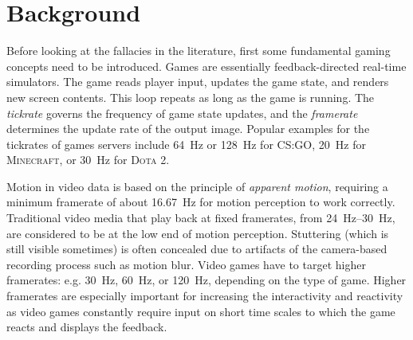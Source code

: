 \section{Background}
\label{sec:background}

Before looking at the fallacies in the literature, first some fundamental gaming concepts need to be introduced. Games are essentially feedback-directed real-time simulators. The game reads player input, updates the game state, and renders new screen contents. This loop repeats as long as the game is running. The \textit{tickrate} governs the frequency of game state updates, and the \textit{framerate} determines the update rate of the output image. Popular examples for the tickrates of games servers include \SI{64}{\hertz} or \SI{128}{\hertz} for \textsc{CS:GO}, \SI{20}{\hertz} for \textsc{Minecraft}, or \SI{30}{\hertz} for \textsc{Dota 2}.

Motion in video data is based on the principle of \textit{apparent motion}, requiring a minimum framerate of about \SI{16.67}{\hertz} for motion perception to work correctly. Traditional video media that play back at fixed framerates, from \SIrange{24}{30}{\hertz}, are considered to be at the low end of motion perception. Stuttering (which is still visible sometimes) is often concealed due to artifacts of the camera-based recording process such as motion blur. Video games have to target higher framerates: e.g. \SI{30}{\hertz}, \SI{60}{\hertz}, or \SI{120}{\hertz}, depending on the type of game. Higher framerates are especially important for increasing the interactivity and reactivity as video games constantly require input on short time scales to which the game reacts and displays the feedback.

